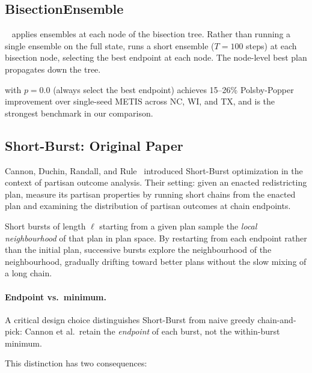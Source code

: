 \subsection{BisectionEnsemble}

\be{}~\citep{h1paper} applies \recom{} ensembles at each node of the
\ar{} bisection tree.
Rather than running a single ensemble on the full state, \be{} runs
a short ensemble ($T = 100$ steps) at each bisection node, selecting
the best endpoint at each node.
The node-level best plan propagates down the tree.

\be{} with $p = 0.0$ (always select the best endpoint) achieves
15--26\% Polsby-Popper improvement over single-seed METIS across
NC, WI, and TX, and is the strongest benchmark in our comparison.

\subsection{Short-Burst: Original Paper}

Cannon, Duchin, Randall, and Rule~\citep{cannon2022} introduced
Short-Burst optimization in the context of partisan outcome analysis.
Their setting: given an enacted redistricting plan, measure its partisan
properties by running short \recom{} chains from the enacted plan
and examining the distribution of partisan outcomes at chain endpoints.

Short bursts of length $\ell$ starting from a given plan sample the
\emph{local neighbourhood} of that plan in plan space.
By restarting from each endpoint rather than the initial plan, successive
bursts explore the neighbourhood of the neighbourhood, gradually
drifting toward better plans without the slow mixing of a long chain.

\paragraph{Endpoint vs.\ minimum.}

A critical design choice distinguishes Short-Burst from naive greedy
chain-and-pick:
Cannon et al.\ retain the \emph{endpoint} of each burst, not the
within-burst minimum.

This distinction has two consequences:

